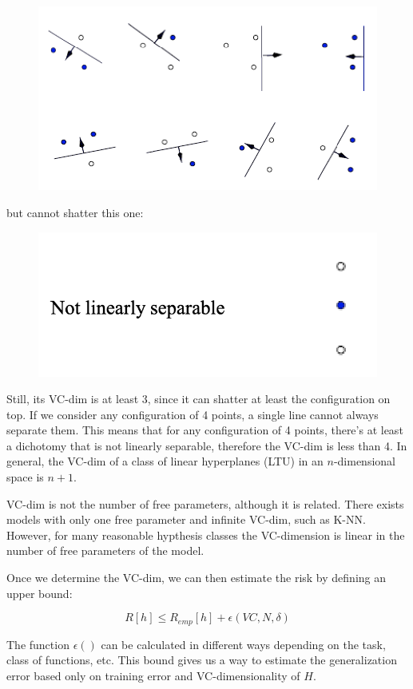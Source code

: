 \begin{figure}[h]
    \centering
    \includegraphics[width=0.5\linewidth]{img/shattering_1.png} 
\end{figure}

but cannot shatter this one:

\begin{figure}[h]
    \centering
    \includegraphics[width=0.5\linewidth]{img/Shattering_2.png}
\end{figure}

Still, its VC-dim is at least 3, since it can shatter at least the configuration on top. If we consider any configuration of 4 points, a single line cannot always separate them. This means that for any configuration of 4 points, there's at least a dichotomy that is not linearly separable, therefore the VC-dim is less than 4. In general, the VC-dim of a class of linear hyperplanes (LTU) in an $n$-dimensional space is $n+1$.

VC-dim is not the number of free parameters, although it is related. There exists models with only one free parameter and infinite VC-dim, such as K-NN. However, for many reasonable hypthesis classes the VC-dimension is linear in the number of free parameters of the model.

Once we determine the VC-dim, we can then estimate the risk by defining an upper bound:

\begin{equation*}
    R[h] \leq R_{emp}[h] + \epsilon (VC,N,\delta)
\end{equation*}

The function $\epsilon()$ can be calculated in different ways depending on the task, class of functions, etc. This bound gives us a way to estimate the generalization error based only on training error and VC-dimensionality of $H$.


